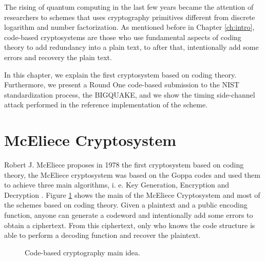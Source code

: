 The rising of quantum computing in the last few years became the attention of researchers to schemes that uses cryptography primitives different from discrete logarithm and number factorization. As mentioned before in Chapter \ref{ch:intro}, code-based cryptosystems are those who use fundamental aspects of coding theory to add redundancy into a plain text, to after that, intentionally add some errors and recovery the plain text. 

In this chapter, we explain the first cryptosystem based on coding theory. Furthermore, we present a Round One code-based submission to the NIST standardization process, the BIGQUAKE, and we show the timing side-channel attack performed in the reference implementation of the scheme.

\section{McEliece Cryptosystem}
Robert J. McEliece proposes in 1978 the first cryptosystem based on coding theory, the McEliece cryptosystem was based on the Goppa codes and used them to achieve three main algorithms, i. e. Key Generation, Encryption and Decryption \cite{mceliece1978public}. Figure \ref{fig:code-idea} shows the main of the McEliece Cryptosystem and most of the schemes based on coding theory. Given a plaintext and a public encoding function, anyone can generate a codeword and intentionally add some errors to obtain a ciphertext. From this ciphertext, only who knows the code structure is able to perform a decoding function and recover the plaintext.


\begin{figure}
    \centering
    \label{fig:code-idea}
    \caption{Code-based cryptography main idea.}
\end{figure}

